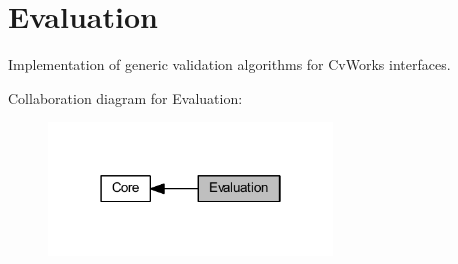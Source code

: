 \hypertarget{group___evaluation}{}\section{Evaluation}
\label{group___evaluation}


Implementation of generic validation algorithms for Cv\+Works interfaces.  


Collaboration diagram for Evaluation\+:
\nopagebreak
\begin{figure}[H]
\begin{center}
\leavevmode
\includegraphics[width=214pt]{group___evaluation}
\end{center}
\end{figure}
